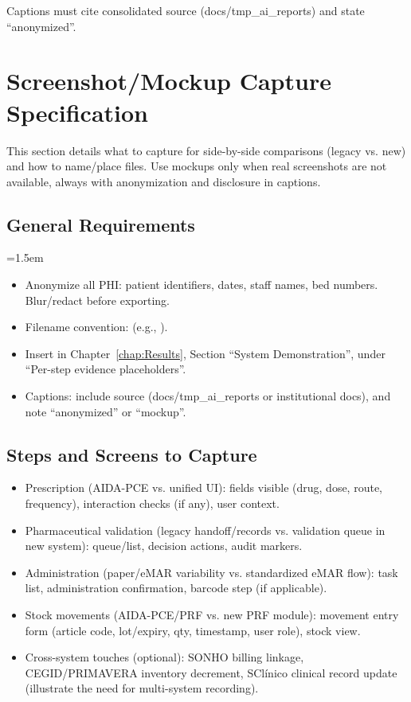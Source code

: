 Captions must cite consolidated source (docs/tmp\_ai\_reports) and state “anonymized”.

\section{Screenshot/Mockup Capture Specification}
This section details what to capture for side-by-side comparisons (legacy vs. new) and how to name/place files. Use mockups only when real screenshots are not available, always with anonymization and disclosure in captions.
\subsection*{General Requirements}
\begingroup\emergencystretch=1.5em
\begin{itemize}
    \item Anonymize all PHI: patient identifiers, dates, staff names, bed numbers. Blur/redact before exporting.
    \item Filename convention: \texttt{} (e.g., \texttt{}).
    \item Insert in Chapter~\ref{chap:Results}, Section ``System Demonstration'', under ``Per-step evidence placeholders''.
    \item Captions: include source (docs/tmp\_ai\_reports or institutional docs), and note \textquotedblleft anonymized\textquotedblright{} or \textquotedblleft mockup\textquotedblright{}.
\end{itemize}
\endgroup

\subsection*{Steps and Screens to Capture}
\begin{itemize}
    \item Prescription (AIDA-PCE vs. unified UI): fields visible (drug, dose, route, frequency), interaction checks (if any), user context.
    \item Pharmaceutical validation (legacy handoff/records vs. validation queue in new system): queue/list, decision actions, audit markers.
    \item Administration (paper/eMAR variability vs. standardized eMAR flow): task list, administration confirmation, barcode step (if applicable).
    \item Stock movements (AIDA-PCE/PRF vs. new PRF module): movement entry form (article code, lot/expiry, qty, timestamp, user role), stock view.
    \item Cross-system touches (optional): SONHO billing linkage, CEGID/PRIMAVERA inventory decrement, SClínico clinical record update (illustrate the need for multi-system recording).
\end{itemize}

